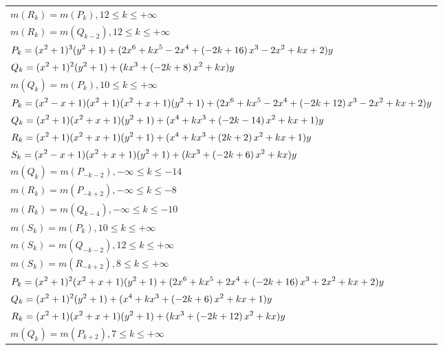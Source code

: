 \documentclass{amsart}
\begin{document}
\begin{longtable}{|l|}
\(\displaystyle m(R_k) = m(P_{k}),12 \leqslant k \leqslant +\infty\)\\
\(\displaystyle m(R_k) = m(Q_{k
 - 2}),12 \leqslant k \leqslant +\infty\)\\
\hline
\(\displaystyle P_k=(x^2
 + 1)^{3}(y^2+1)+(2\*x^6
 + k\*x^5
 - 2\*x^4
 + \left(-2\*k
 + 16\right) \*x^3
 - 2\*x^2
 + k\*x
 + 2)y\)\\
\(\displaystyle Q_k=(x^2
 + 1)^{2}(y^2+1)+(k\*x^3
 + \left(-2\*k
 + 8\right) \*x^2
 + k\*x)y\)\\
\(\displaystyle m(Q_k) = m(P_{k}),10 \leqslant k \leqslant +\infty\)\\
\hline
\(\displaystyle P_k=(x^2
 - x
 + 1)(x^2
 + 1)(x^2
 + x
 + 1)(y^2+1)+(2\*x^6
 + k\*x^5
 - 2\*x^4
 + \left(-2\*k
 + 12\right) \*x^3
 - 2\*x^2
 + k\*x
 + 2)y\)\\
\(\displaystyle Q_k=(x^2
 + 1)(x^2
 + x
 + 1)(y^2+1)+(x^4
 + k\*x^3
 + \left(-2\*k
 - 14\right) \*x^2
 + k\*x
 + 1)y\)\\
\(\displaystyle R_k=(x^2
 + 1)(x^2
 + x
 + 1)(y^2+1)+(x^4
 + k\*x^3
 + \left(2\*k
 + 2\right) \*x^2
 + k\*x
 + 1)y\)\\
\(\displaystyle S_k=(x^2
 - x
 + 1)(x^2
 + x
 + 1)(y^2+1)+(k\*x^3
 + \left(-2\*k
 + 6\right) \*x^2
 + k\*x)y\)\\
\(\displaystyle m(Q_k) = m(P_{-k
 - 2}),-\infty \leqslant k \leqslant -14\)\\
\(\displaystyle m(R_k) = m(P_{-k
 + 2}),-\infty \leqslant k \leqslant -8\)\\
\(\displaystyle m(R_k) = m(Q_{k
 - 4}),-\infty \leqslant k \leqslant -10\)\\
\(\displaystyle m(S_k) = m(P_{k}),10 \leqslant k \leqslant +\infty\)\\
\(\displaystyle m(S_k) = m(Q_{-k
 - 2}),12 \leqslant k \leqslant +\infty\)\\
\(\displaystyle m(S_k) = m(R_{-k
 + 2}),8 \leqslant k \leqslant +\infty\)\\
\hline
\(\displaystyle P_k=(x^2
 + 1)^{2}(x^2
 + x
 + 1)(y^2+1)+(2\*x^6
 + k\*x^5
 + 2\*x^4
 + \left(-2\*k
 + 16\right) \*x^3
 + 2\*x^2
 + k\*x
 + 2)y\)\\
\(\displaystyle Q_k=(x^2
 + 1)^{2}(y^2+1)+(x^4
 + k\*x^3
 + \left(-2\*k
 + 6\right) \*x^2
 + k\*x
 + 1)y\)\\
\(\displaystyle R_k=(x^2
 + 1)(x^2
 + x
 + 1)(y^2+1)+(k\*x^3
 + \left(-2\*k
 + 12\right) \*x^2
 + k\*x)y\)\\
\(\displaystyle m(Q_k) = m(P_{k
 + 2}),7 \leqslant k \leqslant +\infty\)\\

\end{longtable}
\end{document}
